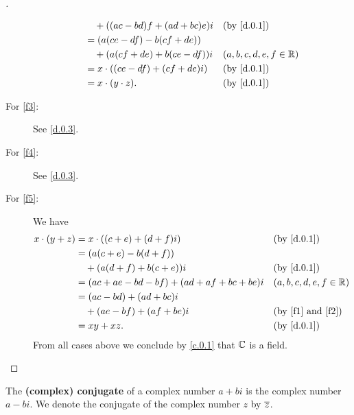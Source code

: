 \begin{proof}[]
\begin{description}
\begin{align*}
                            & \quad + ((ac - bd) f + (ad + bc) e) i &  & \text{(by \cref{d.0.1})}  \\
                            & = (a (ce - df) - b (cf + de))                                        \\
                            & \quad + (a (cf + de) + b(ce - df)) i  &  & (a, b, c, d, e, f \in \R) \\
                            & = x \cdot ((ce - df) + (cf + de) i)   &  & \text{(by \cref{d.0.1})}  \\
                            & = x \cdot (y \cdot z).                &  & \text{(by \cref{d.0.1})}
      \end{align*}
    \item[For \ref{f3}:]
      See \cref{d.0.3}.
    \item[For \ref{f4}:]
      See \cref{d.0.3}.
    \item[For \ref{f5}:]
      We have
      \begin{align*}
        x \cdot (y + z) & = x \cdot ((c + e) + (d + f) i)               &  & \text{(by \cref{d.0.1})}          \\
                        & = (a (c + e) - b (d + f))                                                            \\
                        & \quad + (a (d + f) + b (c + e)) i             &  & \text{(by \cref{d.0.1})}          \\
                        & = (ac + ae - bd - bf) + (ad + af + bc + be) i &  & (a, b, c, d, e, f \in \R)         \\
                        & = (ac - bd) + (ad + bc) i                                                            \\
                        & \quad + (ae - bf) + (af + be) i               &  & \text{(by \ref{f1} and \ref{f2})} \\
                        & = xy + xz.                                    &  & \text{(by \cref{d.0.1})}
      \end{align*}
      From all cases above we conclude by \cref{c.0.1} that \(\mathbb{C}\) is a field.
  \end{description}
\end{proof}

\begin{defn}\label{d.0.4}
  The \textbf{(complex) conjugate} of a complex number \(a + bi\) is the complex number \(a - bi\).
  We denote the conjugate of the complex number \(z\) by \(\overline{z}\).
\end{defn}

